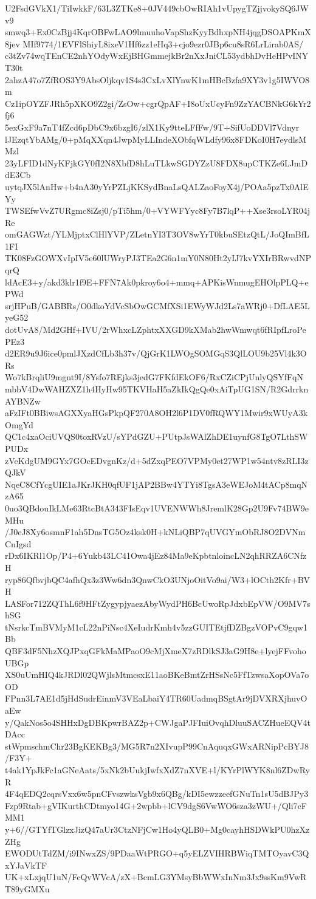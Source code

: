 U2FsdGVkX1/TiIwkkF/63L3ZTKe8+0JV449cbOwRIAh1vUpygTZjjvokySQ6JWv9
smwq3+Ex0CzBjj4KqrOBFwLAO9lmuuhoVapShzKyyBdhxpNH4jqgDSOAPKmX8jev
MIf9774/1EVFlShiyL8ixeV1Hf6zz1eHq3+cjo9ezr0JBp6cu8sR6LrLirab0AS/
c3tZv74wqTEnCE2nhYOdyWxEjBHGmmejkBr2nXxJniCL53ydbhDvHeHPvINYT30t
2ahzA47o7ZfROS3Y9AbsOljkqv1S4s3CxLvXlYnwK1mHBcBzfa9XY3v1g5IWVO8m
Cz1ipOYZFJRh5pXKO9Z2gi/ZsOw+cgrQpAF+I8oUxUcyFn9ZzYACBNkG6kYr2fj6
5exGxF9a7nT4fZcd6pDbC9x6bzgI6/zlX1Ky9tteLFfFw/9T+SifUoDDVl7Vdnyr
lJEzqtYbAMg/0+pMqXXqn4JwpMyLLIndeXObfqWLdfy96x8FDKoI0H7eydlsMMzl
23yLFID1dNyKFjkGY0fI2N8XbfD8hLuTLkwSGDYZzU8FDX8upCTKZe6LJmDdE3Cb
uytqJX5lAnHw+b4nA30yYrPZLjKKSydBnaLsQALZaoFoyX4j/POAa5pzTx0AlEYy
TWSEfwVvZ7URgmc8iZsj0/pTi5hm/0+VYWFYyc8Fy7B7lqP++Xse3rsoLYR04jRe
omGAGWzt/YLMjptxClHlYVP/ZLetnYI3T3OV8wYrT0kbuSEtzQtL/JoQImBfL1FI
TK08FzGOWXvIpIV5e60lUWryPJ3TEa2G6n1mY0N80Ht2yIJ7kvYXIrBRwvdNPqrQ
ldAcE3+y/akd3klr1f9E+FFN7Ak0pkroy6o4+mmq+APKisWnmugEHOlpPLQ+ePWd
srjHPuB/GABBRs/O0dkoYdVcSbOwGCMfXSi1EWyWJd2Ls7aWRj0+DfLAE5LyeG52
dotUvA8/Md2GHf+IVU/2rWhxcLZphtxXXGD9kXMab2hwWmwqt6fRIpfLroPePEz3
d2ER9u9J6ice0pmlJXzdCfLb3h37v/QjGrK1LWOgSOMGqS3QlLOU9b25Vl4k3ORs
Wo7kBrqliU9mgnt9I/8Ysfo7REjks3jedG7FKfdEkOF6/RxCZiCPjUnlyQSYfFqN
mbbV4DwWAHZXZ1h4HyHw95TKVHaH5aZkIkQgQe0xAiTpUG1SN/R2GdrrknAYBNZw
aFzIFt0BBiwsAGXXyaHGsPkpQF270A8OH2l6P1DV0fRQWY1Mwir9xWUyA3kOmgYd
QC1c4xaOciUVQS0toxRVzU/sYPdGZU+PUtpJsWAlZhDE1uynfG8TgO7LthSWPUDx
zVeKdgUM9GYx7GOcEDvgnKz/d+5dZxqPEO7VPMy0et27WP1w54ntv8zRLI3zQJkV
NqeC8CfYcgUIE1aJKrJKH0qfUF1jAP2BBw4YTYi8TgsA3eWEJoM4tACp8mqNzA65
0uo3QBdouIkLMe63RtcBtA343FIsEqv1UVENWWh8JremlK28Gp2U9Fv74BW9eMHu
/J0eJ8Xy6osmnF1ah5DnsTG5Oz4ksk0H+kNLiQBP7qUVGYmObRJ8O2DVNmCnIgsd
rDx6IKRl1Op/P4+6Yukb43LC41Owa4jEz84Ma9eKpbtnloincLN2qhRRZA6CNfzH
ryp86QfbvjbQC4afhQx3z3Ww6dn3QnwCkO3UNjoOitVo9ai/W3+lOCth2Kfr+BVH
LASFor712ZQThL6f9HFtZygypjyaezAbyWydPH6BcUwoRpJdxbEpVW/O9MV7shSG
tNsrkcTmBVMyM1cL22nPiNsc4XeIudrKmh4v5zzGUITEtjfDZBgzVOPvC9gqw1Bb
QBF3dF5NhzXQJPxqGFkMaMPaoO9cMjXmeX7zRDlkSJ3aG9H8e+lyejFFvohoUBGp
XS0uUmHIQ4kJRDl02QWjlsMtmcsxE11aoBKeBmtZrHSsNc5FfTzwsaXopOVa7oOD
FPnn3L7AE1d5jHdSudrEinmV3VEaLbaiY4TR60UadmqBSgtAr9jDVXRXjhuvOaEw
y/QakNos5o4SHHxDgDBKpwrBAZ2p+CWJgaPJFIuiOvqhDluuSACZHueEQV4tDAcc
stWpmschmChr23BgKEKBg3/MG5R7n2XIvupP99CnAquqxGWxARNipPcBYJ8/F3Y+
t4ak1YpJkFc1aGNeAats/5xNk2bUukjIwfxXdZ7nXVE+l/KYrPlWYK8nl6ZDwRyR
4F4qEDQ2cqrsVxx6w5pnCFvszwksVgb9x6QBg/kDI5ewzzeefGNuTn1sU5dBJPy3
Fzp9Rtab+gVIKurthCDtmyo14G+2wpbb+lCV9dgS6VwWO6sza3zWU+/Qli7cFMM1
y+6//GTYfTGlzxJizQ47aUr3CtzNFjCw1Ho4yQLB0+Mg0cayhHSDWkPU0hzXzZHg
EWODUtTdZM/i9INwxZS/9PDaaWtPRGO+q5yELZVIHRBWiqTMTOyavC3QxYJaVkTF
UK+xLxjqU1uN/FcQvWVcA/zX+BcmLG3YMsyBbWWxInNm3Jx9ssKm9VwRT89yGMXu
